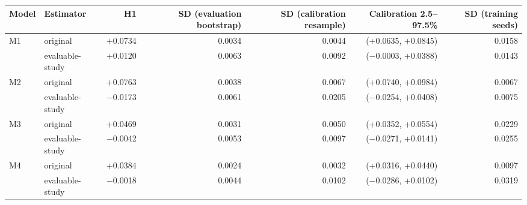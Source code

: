 \begin{tabular}{llrrrrr}
\toprule
Model & Estimator & H1 & SD (evaluation bootstrap) & SD (calibration resample) & Calibration 2.5--97.5\% & SD (training seeds)\\
\midrule
M1 & original & +0.0734 & 0.0034 & 0.0044 & (+0.0635, +0.0845) & 0.0158\\
 & evaluable-study & +0.0120 & 0.0063 & 0.0092 & ($-$0.0003, +0.0388) & 0.0143\\
M2 & original & +0.0763 & 0.0038 & 0.0067 & (+0.0740, +0.0984) & 0.0067\\
 & evaluable-study & $-$0.0173 & 0.0061 & 0.0205 & ($-$0.0254, +0.0408) & 0.0075\\
M3 & original & +0.0469 & 0.0031 & 0.0050 & (+0.0352, +0.0554) & 0.0229\\
 & evaluable-study & $-$0.0042 & 0.0053 & 0.0097 & ($-$0.0271, +0.0141) & 0.0255\\
M4 & original & +0.0384 & 0.0024 & 0.0032 & (+0.0316, +0.0440) & 0.0097\\
 & evaluable-study & $-$0.0018 & 0.0044 & 0.0102 & ($-$0.0286, +0.0102) & 0.0319\\
\bottomrule
\end{tabular}
